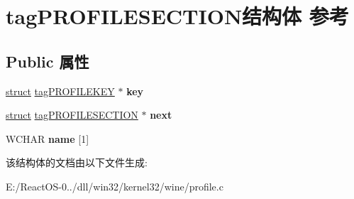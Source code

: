 \hypertarget{structtag_p_r_o_f_i_l_e_s_e_c_t_i_o_n}{}\section{tag\+P\+R\+O\+F\+I\+L\+E\+S\+E\+C\+T\+I\+O\+N结构体 参考}
\label{structtag_p_r_o_f_i_l_e_s_e_c_t_i_o_n}
\subsection*{Public 属性}
\begin{DoxyCompactItemize}
\item 
\mbox{\label{structtag_p_r_o_f_i_l_e_s_e_c_t_i_o_n_a938bff22e1cdbfef298daa44927dccaa}} 
\hyperlink{interfacestruct}{struct} \hyperlink{structtag_p_r_o_f_i_l_e_k_e_y}{tag\+P\+R\+O\+F\+I\+L\+E\+K\+EY} $\ast$ {\bfseries key}
\item 
\mbox{\label{structtag_p_r_o_f_i_l_e_s_e_c_t_i_o_n_a1807f43c1fc7306aebffad5659d4fe4f}} 
\hyperlink{interfacestruct}{struct} \hyperlink{structtag_p_r_o_f_i_l_e_s_e_c_t_i_o_n}{tag\+P\+R\+O\+F\+I\+L\+E\+S\+E\+C\+T\+I\+ON} $\ast$ {\bfseries next}
\item 
\mbox{\label{structtag_p_r_o_f_i_l_e_s_e_c_t_i_o_n_a0c11697ded96cd35d15d2cf1dd496728}} 
W\+C\+H\+AR {\bfseries name} \mbox{[}1\mbox{]}
\end{DoxyCompactItemize}


该结构体的文档由以下文件生成\+:\begin{DoxyCompactItemize}
\item 
E\+:/\+React\+O\+S-\/0../dll/win32/kernel32/wine/profile.\+c\end{DoxyCompactItemize}
